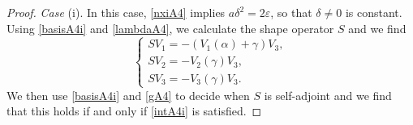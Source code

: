 \documentclass{amsart}
\theoremstyle{plain}
\theoremstyle{remark}
\begin{document}
{\begin{proof}
\smallskip
{\em Case }(i). In this case, \eqref{nxiA4} implies $a\delta^2=2\varepsilon$, so that $\delta \neq 0$ is constant. Using \eqref{basisA4i} and \eqref{lambdaA4}, we calculate the shape operator $S$ and we find
%
\begin{equation}\label{sA4i}
\left\{
\begin{array}{l}
SV_1 =  -(V_1(\alpha)+\gamma) V_3, \\[2 pt]
SV_2 =  -V_2(\gamma) V_3, \\[2 pt]
SV_3 =  -V_3(\gamma)V_3.
\end{array}
\right.
\end{equation}
%
%
%
%
We then use \eqref{basisA4i} and \eqref{gA4} to decide when $S$ is self-adjoint and we find that this holds if and only if \eqref{intA4i} is satisfied. 


\end{proof}}
\end{document}
